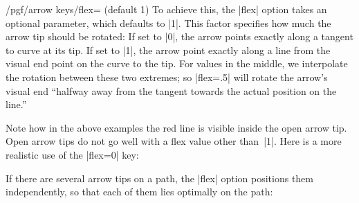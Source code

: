 \begin{key}{/pgf/arrow keys/flex= (default 1)}
  To achieve this, the |flex| option takes an optional 
  parameter, which defaults to |1|. This factor specifies how much the
  arrow tip should be rotated: If set to |0|, the arrow points exactly
  along a tangent to curve at its tip. If set to |1|, the arrow point
  exactly along a line from the visual end point on the curve to the
  tip. For values in the middle, we interpolate the rotation between
  these two extremes; so |flex=.5| will rotate the arrow's visual end
  ``halfway away from the tangent towards the actual position on the
  line.'' 
\begin{codeexample}[]
\end{codeexample}
\begin{codeexample}[]
\end{codeexample}
  Note how in the above examples the red line is visible inside the
  open arrow tip. Open arrow tips do not go well with a flex value
  other than~|1|. Here is a more realistic use of the |flex=0| key:
\begin{codeexample}[]
\end{codeexample}
  If there are several arrow tips on a path, the |flex| option
  positions them independently, so that each of them lies optimally on
  the path:
\begin{codeexample}[]
\end{codeexample}
\end{key}


